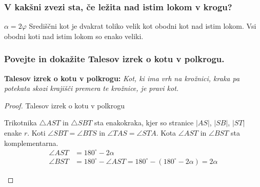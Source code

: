 \documentclass{article}
\begin{document}
\subsubsection*{V kakšni zvezi sta, če ležita nad istim lokom v krogu?}

$\alpha=2 \varphi$ Središčni kot je dvakrat toliko velik kot obodni kot nad istim lokom. Vsi obodni koti nad istim lokom so enako veliki.

\subsubsection*{Povejte in dokažite Talesov izrek o kotu v polkrogu.}

\textbf{Talesov izrek o kotu v polkrogu:} \textit{Kot, ki ima vrh na krožnici, kraka pa potekata skozi krajišči premera te krožnice, je pravi kot.}

\begin{proof}
    Talesov izrek o kotu v polkrogu

    Trikotnika $\triangle AST$ in $\triangle SBT$ sta enakokraka, kjer so stranice $|AS|$, $|SB|$, $|ST|$ enake $r$. Koti $\angle SBT = \angle BTS$ in $\angle TAS = \angle STA$. Kota $\angle AST$ in $\angle BST$ sta komplementarna. 
    \begin{align*}
        \angle AST &= 180^\circ - 2\alpha \\
        \angle BST &= 180^\circ - \angle AST = 180^\circ - (180^\circ - 2\alpha) = 2\alpha
    \end{align*}

    \begin{center}
    \end{center}
\end{proof}
\end{document}
